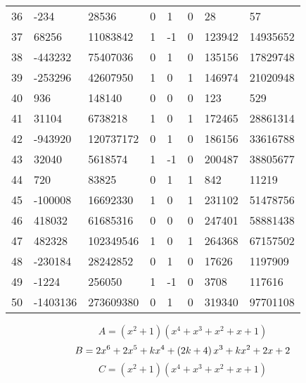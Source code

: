 \documentclass{amsart}
\begin{document}
\begin{longtable}{|l|l|l|lllll|}
36&-234&28536&0&1&0&28&57\\
37&68256&11083842&1&-1&0&123942&14935652\\
38&-443232&75407036&0&1&0&135156&17829748\\
39&-253296&42607950&1&0&1&146974&21020948\\
40&936&148140&0&0&0&123&529\\
41&31104&6738218&1&0&1&172465&28861314\\
42&-943920&120737172&0&1&0&186156&33616788\\
43&32040&5618574&1&-1&0&200487&38805677\\
44&720&83825&0&1&1&842&11219\\
45&-100008&16692330&1&0&1&231102&51478756\\
46&418032&61685316&0&0&0&247401&58881438\\
47&482328&102349546&1&0&1&264368&67157502\\
48&-230184&28242852&0&1&0&17626&1197909\\
49&-1224&256050&1&-1&0&3708&117616\\
50&-1403136&273609380&0&1&0&319340&97701108\\
\hline
\end{longtable}
$$A=(x^2
 + 1)(x^4
 + x^3
 + x^2
 + x
 + 1)$$
$$B=2\*x^6
 + 2\*x^5
 + k\*x^4
 + \left(2\*k
 + 4\right) \*x^3
 + k\*x^2
 + 2\*x
 + 2$$
$$C=(x^2
 + 1)(x^4
 + x^3
 + x^2
 + x
 + 1)$$
\end{document}
